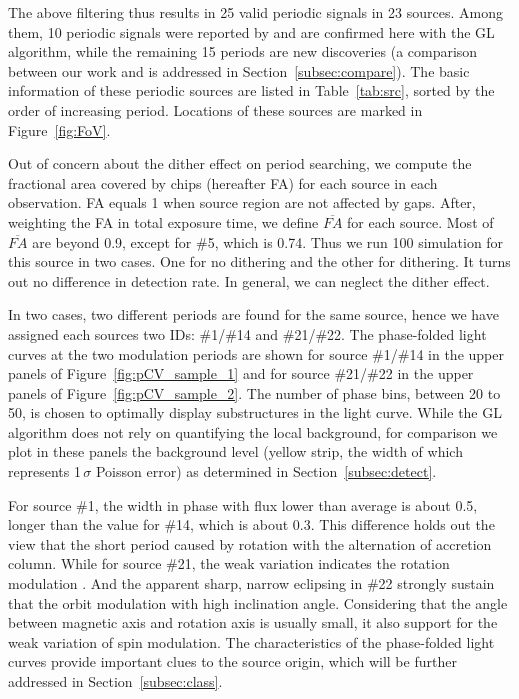 \documentclass[fleqn,usenatbib]{mnras}
\begin{document}
The above filtering thus results in 25 valid periodic signals in 23 sources.
Among them, 10 periodic signals were reported by \citet{2012ApJ...746..165H} and are confirmed here with the GL algorithm, while the remaining 15 periods are new discoveries (a comparison between our work and \citealp{2012ApJ...746..165H} is addressed in Section~\ref{subsec:compare}). 
The basic information of these periodic sources are listed in Table~\ref{tab:src}, sorted by the order of increasing period. 
Locations of these sources are marked in Figure~\ref{fig:FoV}.

Out of concern about the dither effect on period searching, we compute the fractional area covered by chips (hereafter FA) for each source in each observation. FA equals 1 when source region are not affected by gaps. After, weighting the FA in total exposure time, we define $\overline{FA}$ for each source. Most of $\overline{FA}$ are beyond 0.9, except for \#5, which is 0.74. Thus we run 100 simulation for this source in two cases. One for no dithering and the other for dithering. It turns out no difference in detection rate. In general, we can neglect the dither effect. 

In two cases, two different periods are found for the same source, hence we have assigned each sources two IDs: \#1/\#14 and \#21/\#22.  
The phase-folded light curves at the two modulation periods are shown for source \#1/\#14 in the upper panels of  Figure~\ref{fig:pCV_sample_1} and for source \#21/\#22 in the upper panels of Figure~\ref{fig:pCV_sample_2}. 
The number of phase bins, between 20 to 50, is chosen to optimally display substructures in the light curve. 
While the GL algorithm does not rely on quantifying the local background, for comparison we plot in these panels the background level (yellow strip, the width of which represents 1\,$\sigma$ Poisson error) as determined in Section~\ref{subsec:detect}.
 
 For source \#1, the width in phase with flux lower than average is about 0.5, longer than the value for \#14, which is about 0.3. This difference holds out the view that the short period caused by rotation with the alternation of accretion column.
 While for source \#21, the weak variation indicates the rotation modulation . And the apparent sharp, narrow eclipsing in \#22 strongly sustain that the orbit modulation with high inclination angle. Considering that the angle between magnetic axis and rotation axis is usually small, it also support for the weak variation of spin modulation.
The characteristics of the phase-folded light curves provide important clues to the source origin, which will be further addressed in Section~\ref{subsec:class}.
\end{document}
